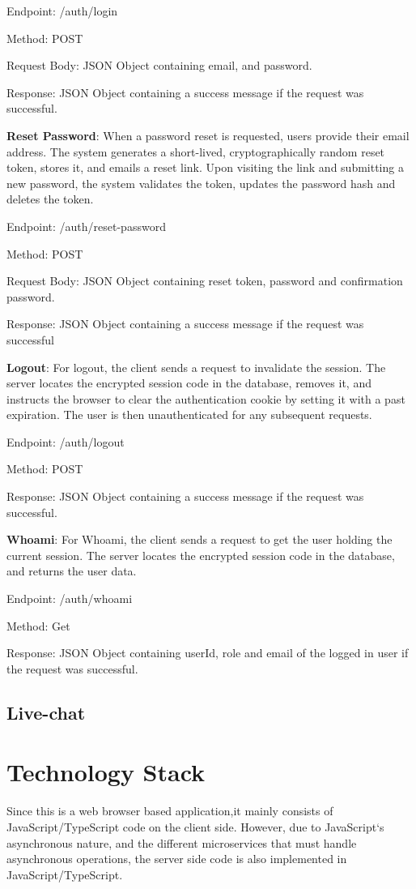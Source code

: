 Endpoint: /auth/login

Method: POST

Request Body: JSON Object containing email, and password.

Response: JSON Object containing a success message if the request was successful.

\textbf{Reset Password}: When a password reset is requested, users provide their email address. The system generates a short-lived, cryptographically random reset token, stores it, and emails a reset link. Upon visiting the link and submitting a new password, the system validates the token, updates the password hash and deletes the token.

Endpoint: /auth/reset-password

Method: POST

Request Body: JSON Object containing reset token, password and confirmation password.

Response: JSON Object containing a success message if the request was successful


\textbf{Logout}: For logout, the client sends a request to invalidate the session. The server locates the encrypted session code in the database, removes it, and instructs the browser to clear the authentication cookie by setting it with a past expiration. The user is then unauthenticated for any subsequent requests.

Endpoint: /auth/logout

Method: POST

Response: JSON Object containing a success message if the request was successful.

\textbf{Whoami}: For Whoami, the client sends a request to get the user holding the current session. The server locates the encrypted session code in the database, and returns the user data.

Endpoint: /auth/whoami

Method: Get

Response: JSON Object containing userId, role and email of the logged in user if the request was successful.

\subsection{Live-chat}

\section{Technology Stack}
Since this is a web browser based application,it mainly consists of JavaScript/TypeScript code on the client side. However, due to JavaScript`s asynchronous nature, and the different microservices that must handle asynchronous operations, the server side code is also implemented in JavaScript/TypeScript.
